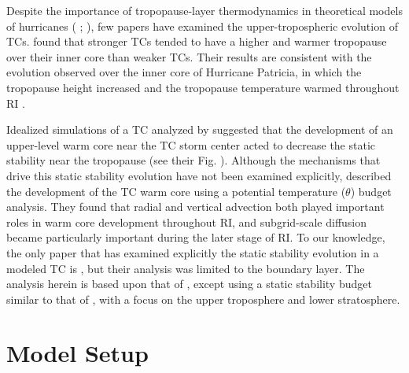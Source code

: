 \documentclass{ametsoc}
\begin{document}
Despite the importance of tropopause-layer thermodynamics in theoretical models of hurricanes (\citeauthor{EmanuelRotunno2011} \citeyear{EmanuelRotunno2011}; \citeauthor{Emanuel2012} \citeyear{Emanuel2012}), few papers have examined the upper-tropospheric evolution of TCs.
\cite{KomaromiDoyle2017} found that stronger TCs tended to have a higher and warmer tropopause over their inner core than weaker TCs.
Their results are consistent with the evolution observed over the inner core of Hurricane Patricia, in which the tropopause height increased and the tropopause temperature warmed throughout RI \citep{DuranMolinari2018}.

Idealized simulations of a TC analyzed by \cite{OhnoSatoh2015} suggested that the development of an upper-level warm core near the TC storm center acted to decrease the static stability near the tropopause (see their Fig. ).
Although the mechanisms that drive this static stability evolution have not been examined explicitly, \cite{SternZhang2013} described the development of the TC warm core using a potential temperature ($\theta$) budget analysis.
They found that radial and vertical advection both played important roles in warm core development throughout RI, and subgrid-scale diffusion became particularly important during the later stage of RI.
To our knowledge, the only paper that has examined explicitly the static stability evolution in a modeled TC is \cite{Kepertetal2016}, but their analysis was limited to the boundary layer.
The analysis herein is based upon that of \cite{SternZhang2013}, except using a static stability budget similar to that of \cite{Kepertetal2016}, with a focus on the upper troposphere and lower stratosphere.

 \section{Model Setup}
\end{document}
